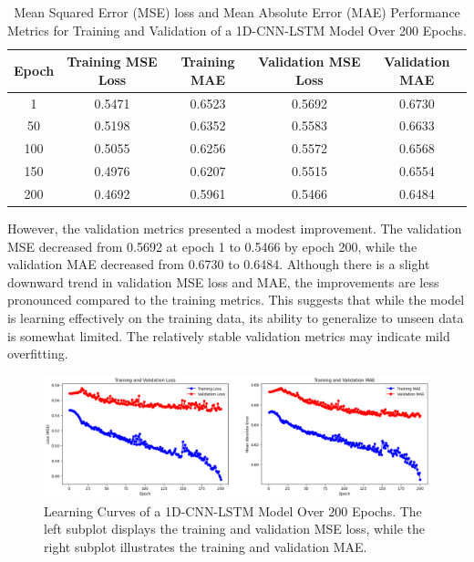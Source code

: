\documentclass[a4paper]{article}
\begin{document}
\begin{table}[h]
\centering
\begin{tabular}{|c|c|c|c|c|} \hline
\textbf{Epoch} & \textbf{Training MSE Loss} & \textbf{Training MAE} & \textbf{Validation MSE Loss} & \textbf{Validation MAE} \\ \hline
1              & 0.5471                     & 0.6523                & 0.5692                       & 0.6730                  \\ \hline
50             & 0.5198                     & 0.6352                & 0.5583                       & 0.6633                  \\ \hline
100            & 0.5055                     & 0.6256                & 0.5572                       & 0.6568                  \\ \hline
150            & 0.4976                     & 0.6207                & 0.5515                       & 0.6554                  \\ \hline
200            & 0.4692                     & 0.5961                & 0.5466                       & 0.6484                  \\ \hline
\end{tabular}
\caption{ Mean Squared Error (MSE) loss and Mean Absolute Error (MAE) Performance Metrics for Training and Validation of a 1D-CNN-LSTM Model Over 200 Epochs.}
\label{tab:1D-CNN-LSTM-model_performance}
\end{table}

\noindent However, the validation metrics presented a modest improvement. The validation MSE decreased from 0.5692 at epoch 1 to 0.5466 by epoch 200, while the validation MAE decreased from 0.6730 to 0.6484. Although there is a slight downward trend in validation MSE loss and MAE, the improvements are less pronounced compared to the training metrics. This suggests that while the model is learning effectively on the training data, its ability to generalize to unseen data is somewhat limited. The relatively stable validation metrics may indicate mild overfitting.\\

\begin{figure}
    \centering
    \includegraphics[width=1\linewidth]{updatedLC-hybrid.png}
    \caption {Learning Curves of a 1D-CNN-LSTM Model Over 200 Epochs. The left subplot displays the training and validation MSE loss, while the right subplot illustrates the training and validation MAE.}
    \label{fig:mseless_mae1DCNN-LSTM}
\end{figure}
\end{document}
